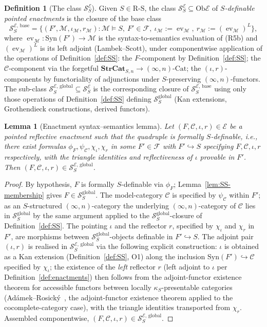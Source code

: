 \documentclass[11pt]{article}
\theoremstyle{plain}
\newtheorem{lemma}[theorem]{Lemma}
\theoremstyle{definition}
\newtheorem{definition}[theorem]{Definition}
\newcommand{\RS}{\mathrm{R\text{-}S}}
\newcommand{\cS}{\mathcal{S}}
\newcommand{\cF}{\mathcal{F}}
\newcommand{\cM}{\mathcal{M}}
\newcommand{\cC}{\mathcal{C}}
\newcommand{\Ob}{\mathrm{Ob}}
\newcommand{\Cat}{\mathrm{Cat}}
\newcommand{\Syn}{\mathrm{Syn}}
\newcommand{\cE}{\mathcal{E}}
\newcommand{\SSE}{\cS_{S}^{\cE}}
\newcommand{\SSEbase}{\cS_{S}^{\cE,\,\mathrm{base}}}
\newcommand{\SSEglobal}{\cS_{S}^{\cE,\,\mathrm{global}}}
\DeclareMathOperator{\ev}{ev}
\begin{document}
\begin{definition}[The class $\SSE$]\label{def:SSE}
Given $S \in \RS$, the class $\SSE \subseteq \Ob \cE$ of \emph{$S$-definable pointed enactments} is the closure of the base class
\[
  \SSEbase = \bigl\{ (F', \cM, \iota_\cM, r_\cM) : \cM \models S,\ F' \in \cF,\ \iota_\cM := \ev_\cM,\ r_\cM := (\ev_\cM)^L \bigr\},
\]
where $\ev_\cM : \Syn(F') \to \cM$ is the syntax-to-semantics evaluation of (R5b) and $(\ev_\cM)^L$ is its left adjoint (Lambek--Scott), under componentwise application of the operations of Definition~\ref{def:SS}: the $F$-component by Definition~\ref{def:SS}; the $\cC$-component via the forgetful $\mathbf{StrCat}_{S, n} \to (\infty, n)\text{-}\Cat$; the $(\iota, r)$-components by functoriality of adjunctions under $S$-preserving $(\infty, n)$-functors. The sub-class $\SSEglobal \subseteq \SSE$ is the corresponding closure of $\SSEbase$ using only those operations of Definition~\ref{def:SS} defining $\cS_S^{\mathrm{global}}$ (Kan extensions, Grothendieck constructions, derived functors).
\end{definition}

\begin{lemma}[Enactment syntax--semantics lemma]\label{lem:SS-membership-E}
Let $(F, \cC, \iota, r) \in \cE$ be a pointed reflective enactment such that the quadruple is formally $S$-definable, i.e., there exist formulas $\phi_F, \psi_\cC, \chi_\iota, \chi_r$ in some $F' \in \cF$ with $F' \hookrightarrow S$ specifying $F, \cC, \iota, r$ respectively, with the triangle identities and reflectiveness of $\iota$ provable in $F'$. Then $(F, \cC, \iota, r) \in \SSEglobal$.
\end{lemma}

\begin{proof}
By hypothesis, $F$ is formally $S$-definable via $\phi_F$; Lemma~\ref{lem:SS-membership} gives $F \in \cS_S^{\mathrm{global}}$. The model-category $\cC$ is specified by $\psi_\cC$ within $F'$; as an $S$-structured $(\infty, n)$-category the underlying $(\infty, n)$-category of $\cC$ lies in $\cS_S^{\mathrm{global}}$ by the same argument applied to the $\cS_S^{\mathrm{global}}$-closure of Definition~\ref{def:SS}. The pointing $\iota$ and the reflector $r$, specified by $\chi_\iota$ and $\chi_r$ in $F'$, are morphisms between $\cS_S^{\mathrm{global}}$-objects definable in $F' \hookrightarrow S$. The adjoint pair $(\iota, r)$ is realised in $\SSEglobal$ via the following explicit construction: $\iota$ is obtained as a Kan extension (Definition~\ref{def:SS}, O1) along the inclusion $\Syn(F') \hookrightarrow \cC$ specified by $\chi_\iota$; the existence of the \emph{left} reflector $r$ (left adjoint to $\iota$ per Definition~\ref{def:enactments}) then follows from the adjoint-functor existence theorem for accessible functors between locally $\kappa_S$-presentable categories (Ad\'amek--Rosick\'y~\cite{AdamekRosicky1994}, the adjoint-functor existence theorem applied to the cocomplete-category case), with the triangle identities transported from $\chi_r$. Assembled componentwise, $(F, \cC, \iota, r) \in \SSEglobal$.
\end{proof}
\end{document}
